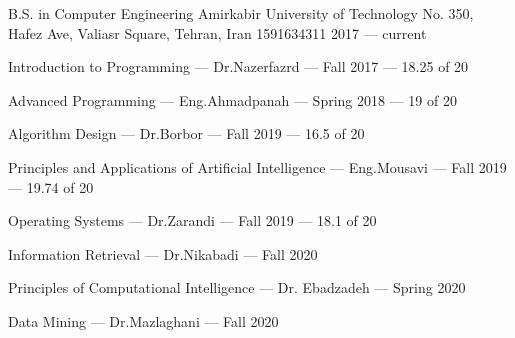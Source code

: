 

\begin{cventries}

  \cventry
    {B.S. in Computer Engineering} %
    {Amirkabir University of Technology} %
    {No. 350, Hafez Ave, Valiasr Square, Tehran, Iran 1591634311} %
    {2017 --- current} %
    {
        \begin{cvitems}
            \item Introduction to Programming --- Dr.Nazerfazrd --- Fall 2017 --- 18.25 of 20
            \item Advanced Programming --- Eng.Ahmadpanah --- Spring 2018 --- 19 of 20
            \item Algorithm Design --- Dr.Borbor --- Fall 2019 --- 16.5 of 20
            \item Principles and Applications of Artificial Intelligence --- Eng.Mousavi --- Fall 2019 --- 19.74 of 20
            \item Operating Systems --- Dr.Zarandi --- Fall 2019 --- 18.1 of 20
            \item Information Retrieval --- Dr.Nikabadi --- Fall 2020
            \item Principles of Computational Intelligence --- Dr. Ebadzadeh --- Spring 2020
            \item Data Mining --- Dr.Mazlaghani --- Fall 2020
        \end{cvitems}
    }

\end{cventries}
